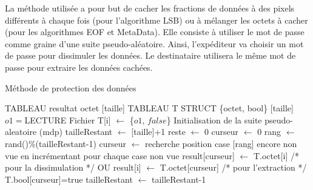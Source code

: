 \documentclass[11pt]{article}
\begin{document}
La méthode utilisée a pour but de cacher les fractions de données à des pixels 
différents à chaque fois (pour l'algorithme LSB) ou à mélanger les octets 
à cacher (pour les algorithmes EOF et MetaData). 
Elle consiste à utiliser le mot de passe comme graine d'une suite pseudo-aléatoire. 
Ainsi, l'expéditeur va choisir un mot de passe pour dissimuler les données. 
Le destinataire utilisera le même mot de passe pour extraire les données cachées.

\begin{algorithm}
\caption{Méthode de protection des données}
\begin{algorithmic}
\footnotesize
\STATE TABLEAU resultat {octet} [taille]
\STATE TABLEAU T STRUCT \{octet, bool\} [taille]
\STATE $o1 = $LECTURE Fichier
\STATE T[i] $\leftarrow$ \{$o1$, $false$\}
\ENDFOR
\STATE Initialisation de la suite pseudo-aleatoire (mdp)
\STATE tailleRestant $\leftarrow$ [taille]+1
\STATE reste $\leftarrow$ 0
\STATE curseur $\leftarrow$ 0
\STATE rang $\leftarrow$ rand()\%(tailleRestant-1)
\STATE curseur $\leftarrow$ recherche position case [rang] encore non vue 
en incrémentant pour chaque case non vue
\color{red}
\STATE result[curseur] $\leftarrow$ T.octet[i] /* pour la dissimulation */
\color{black} OU \color{blue} result[i] $\leftarrow$ T.octet[curseur] /* pour l'extraction */
\color{black}
\STATE T.bool[curseur]=true
\STATE tailleRestant $\leftarrow$ tailleRestant-1
\ENDFOR
\normalsize
\end{algorithmic}
\end{algorithm}
\end{document}
